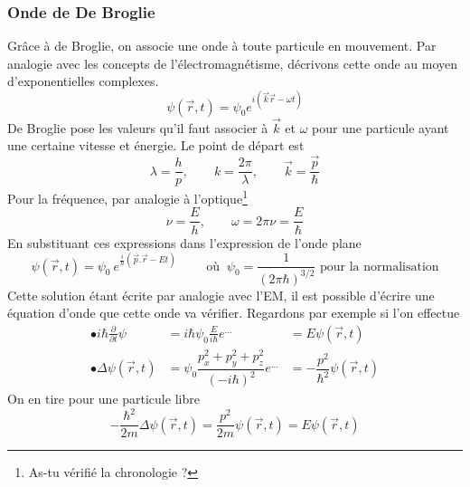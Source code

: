 		\subsubsection{Onde de De Broglie}
		Grâce à de Broglie, on associe une onde à toute particule en mouvement.
		Par analogie avec les concepts de l'électromagnétisme, décrivons cette onde au moyen d'exponentielles complexes.
		\begin{equation}
		\psi(\vec{r},t) = \psi_0e^{i(\vec{k}\vec{r}-\omega t)}
		\end{equation}
		De Broglie pose les valeurs qu'il faut associer à $\vec k$ et $\omega$ pour une particule ayant 
		une certaine vitesse et énergie. Le point de départ est
		\begin{equation}
		\lambda = \dfrac{h}{p},\qquad k=\dfrac{2\pi}{\lambda},\qquad \vec k=\dfrac{\vec{p}}{\hbar}
		\end{equation}
		Pour la fréquence, par analogie à l'optique\footnote{As-tu vérifié la chronologie ?}
		\begin{equation}
		\nu = \dfrac{E}{h},\qquad \omega = 2\pi\nu = \dfrac{E}{\hbar}
		\end{equation}
		En substituant ces expressions dans l'expression de l'onde plane
		\begin{equation}
		\psi(\vec{r},t) = \psi_0\ e^{\frac{i}{\hbar}\left(\vec{p}.\vec{r}-Et\right)}\qquad \text{ où }\ \psi_0 =
		\dfrac{1}{(2\pi\hbar)^{3/2}} \text{ pour la normalisation}
		\end{equation}
		Cette solution étant écrite par analogie avec l'EM, il est possible d'écrire une équation 
		d'onde que cette onde va vérifier. Regardons par exemple si l'on effectue
		\begin{equation}
		\begin{array}{lll}
		\bullet i\hbar\frac{\partial}{\partial t}\psi &= i\hbar \psi_0\frac{E}{i\hbar}e^{\dots} &=
		E\psi(\vec{r},t)\\
		\bullet \Delta \psi(\vec{r},t) &= \psi_0\dfrac{p_x^2+p_y^2+p_z^2}{(-i\hbar)^2}e^{\dots} &= -
		\dfrac{p^2}{\hbar^2}\psi(\vec{r},t)
		\end{array}
		\end{equation}
		On en tire pour une particule libre
		\begin{equation}
		-\dfrac{\hbar^2}{2m}\Delta \psi(\vec{r},t) = \dfrac{p^2}{2m}\psi(\vec{r},t) = E\psi(\vec{r},t)
		\end{equation}
